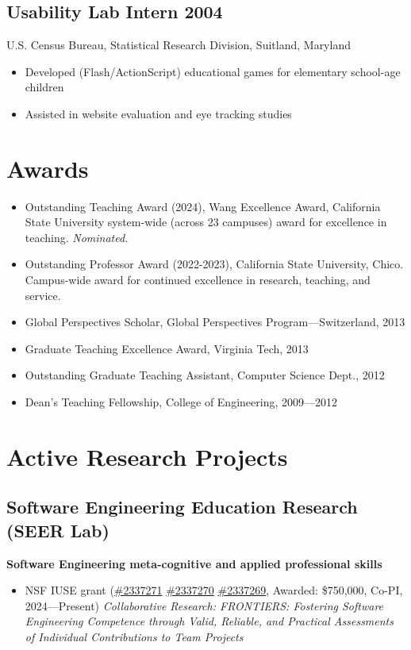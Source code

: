 \documentclass[10pt,letterpaper]{article}
\begin{document}
\subsection*{Usability Lab Intern 2004}
U.S. Census Bureau, Statistical Research Division, Suitland, Maryland
\begin{itemize}[leftmargin=1.5em]
\item Developed (Flash/ActionScript) educational games for elementary school-age children
\item Assisted in website evaluation and eye tracking studies
\end{itemize}
\section*{Awards}
\begin{itemize}[leftmargin=1.5em]
\item Outstanding Teaching Award (2024), Wang Excellence Award, California State University system-wide (across 23 campuses) award for excellence in teaching. \textit{Nominated.}
\item Outstanding Professor Award (2022-2023), California State University, Chico. Campus-wide award for continued excellence in research, teaching, and service.
\item Global Perspectives Scholar, Global Perspectives Program---Switzerland, 2013
\item Graduate Teaching Excellence Award, Virginia Tech, 2013
\item Outstanding Graduate Teaching Assistant, Computer Science Dept., 2012
\item Dean's Teaching Fellowship, College of Engineering, 2009---2012
\end{itemize}
\section*{Active Research Projects}
\subsection*{Software Engineering Education Research (SEER Lab)}
\par \small\textbf{Software Engineering meta-cognitive and applied professional skills}
\begin{itemize}[leftmargin=1.5em]
\item NSF IUSE grant (\href{https://www.nsf.gov/awardsearch/show-award/?AWD_ID=2337271}{\#2337271} \href{https://www.nsf.gov/awardsearch/show-award/?AWD_ID=2337270}{\#2337270} \href{https://www.nsf.gov/awardsearch/show-award/?AWD_ID=2337269}{\#2337269}, Awarded: \$750,000, Co-PI, 2024---Present) \textit{Collaborative Research: FRONTIERS: Fostering Software Engineering Competence through Valid, Reliable, and Practical Assessments of Individual Contributions to Team Projects}
\end{itemize}
\end{document}
